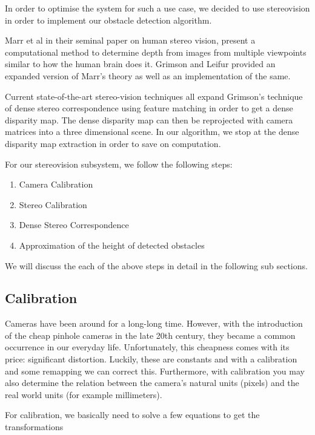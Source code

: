 \documentclass[11pt]{report}
\begin{document}
In order to optimise the system for such a use case, we decided to use stereovision\cite{gonzalez,hartley2000multiple} in order to implement our obstacle detection algorithm. 

Marr et al\cite{marr1991computational} in their seminal paper on human stereo vision, present a computational method to determine depth from images from multiple viewpoints similar to how the human brain does it. Grimson and Leifur \cite{grimson1981computer} provided an expanded version of Marr's theory as well as an implementation of the same.

Current state-of-the-art stereo-vision techniques\cite{taxonomy} all expand Grimson's technique of dense stereo correspondence using feature matching in order to get a dense disparity map. The dense disparity map can then be reprojected with camera matrices into a three dimensional scene. In our algorithm, we stop at the dense disparity map extraction in order to save on computation.

For our stereovision subsystem, we follow the following steps:

\begin{enumerate}
\item Camera Calibration
\item Stereo Calibration
\item Dense Stereo Correspondence
\item Approximation of the height of detected obstacles
\end{enumerate} 

We will discuss the each of the above steps in detail in the following sub sections.
\label{calib}
\subsection{Calibration}

Cameras have been around for a long-long time. However, with the introduction of the cheap pinhole cameras in the late 20th century, they became a common occurrence in our everyday life. Unfortunately, this cheapness comes with its price: significant distortion. Luckily, these are constants and with a calibration and some remapping we can correct this. Furthermore, with calibration you may also determine the relation between the camera’s natural units (pixels) and the real world units (for example millimeters). 

For calibration, we basically need to solve a few equations to get the transformations
\end{document}

